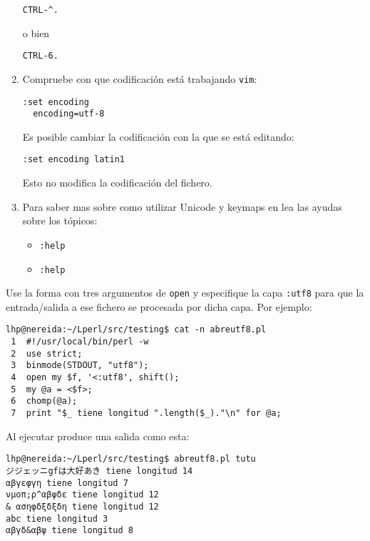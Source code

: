 \begin{htmlonly}
\begin{htmlonly}
\begin{enumerate}
\begin{verbatim}
CTRL-^.
\end{verbatim}
o bien
\begin{verbatim}
CTRL-6.
\end{verbatim}

\item
Compruebe con que codificación está trabajando \verb|vim|:
\begin{verbatim}
:set encoding
  encoding=utf-8 
\end{verbatim}
Es posible cambiar la codificación con la que se está editando:
\begin{verbatim}
:set encoding latin1
\end{verbatim}
Esto no modifica la codificación del fichero.
\item
Para saber mas sobre como utilizar Unicode y keymaps en \vim{} 
lea las ayudas sobre los tópicos:
\begin{itemize}
\item \verb|:help|                      
\item \verb|:help|  
\end{itemize}
\end{enumerate}


Use  la forma con tres argumentos de \verb|open| y especifique
la capa \verb|:utf8| para que la entrada/salida a ese fichero
se procesada por dicha capa. Por ejemplo:

\begin{verbatim}
lhp@nereida:~/Lperl/src/testing$ cat -n abreutf8.pl
 1  #!/usr/local/bin/perl -w
 2  use strict;
 3  binmode(STDOUT, "utf8");
 4  open my $f, '<:utf8', shift();
 5  my @a = <$f>;
 6  chomp(@a);
 7  print "$_ tiene longitud ".length($_)."\n" for @a;
\end{verbatim}

Al ejecutar produce una salida como esta:
\begin{verbatim}
lhp@nereida:~/Lperl/src/testing$ abreutf8.pl tutu
ジジェッニgfは大好あき tiene longitud 14
αβγεφγη tiene longitud 7
νμοπ;ρ^αβψδε tiene longitud 12
& ασηφδξδξδη tiene longitud 12
abc tiene longitud 3
αβγδ&αβψ tiene longitud 8
\end{verbatim}



\end{htmlonly}
\end{htmlonly}
